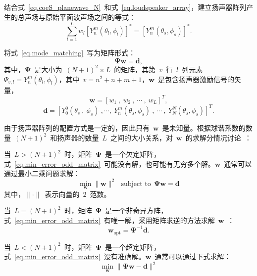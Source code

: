 结合式~\eqref{eq.coeS_planewave_N}~和式~\eqref{eq.loudspeaker_array}，建立扬声器阵列产生的总声场与原始平面波声场之间的等式：
\begin{equation}\label{eq.mode_matching}
   \sum_{l=1}^{L} w_{l} \left[ Y_n ^m(\theta_{l},\phi_{l}) \right] ^{*}  = \left[ Y_n ^m(\theta_{s},\phi_{s})\right] ^{*}.
\end{equation}

将式~\eqref{eq.mode_matching}~写为矩阵形式：
\begin{equation}\label{eq.min_error_odd_matrix}
\bm{\Psi w}=\bm{d},
\end{equation}
其中，$\mathbf{\Psi}$~是大小为~$(N+1)^2\times L$~的矩阵，其第~$v$~行~$l$~列元素~$\Psi_{v,l} = Y_{n}^{m}(\theta_{l},\phi_{l})$，其中~$v=n^2+n+m+1$，$\bm{w}$~是包含扬声器激励信号的矢量，
\begin{equation}\label{eq.matrix_a}
\bm{w} = [w_{1}~,~w_{2}~,~\cdots~,~w_{L}]^{T},
\end{equation}
\begin{equation}\label{eq.matrix_d}
\mathbf{d} = [Y_{0}^{0}(\theta_{s}~,~\phi_{s})~,\cdots,~Y_{n}^{m}(\theta_{s},\phi_{s})~,~\cdots~,~Y_{N}^{N}(\theta_{s},\phi_{s})]^{T}.
\end{equation}

由于扬声器阵列的配置方式是一定的，因此只有~$\bm{w}$~是未知量。根据球谐系数的数量~$(N+1)^2$~和扬声器的数量~$L$~之间的大小关系，对~$\bm{w}$~的求解分情况讨论~：
\begin{compactitem}
\item 当~$L>(N+1)^2$~时，矩阵~$\bm{\Psi}$~是一个欠定矩阵，式~\eqref{eq.min_error_odd_matrix}~可能没有解，也可能有无穷多个解。$\bm{w}$~通常可以通过最小二乘问题求解：
    \begin{equation}
    \mathop{\min}_{\bm{w}} \| \bm{w} \|^{2}~~~\text{subject to}~~\bm{\Psi w = d}
    \end{equation}
    其中，$\| \cdot \|$~表示向量的~2~范数。
\item 当~$L=(N+1)^2$~时，矩阵~$\mathbf{\Psi}$~是一个非奇异方阵，式~\eqref{eq.min_error_odd_matrix}~有唯一解，采用矩阵求逆的方法求解~$\bm{w}$~：
    \begin{equation}
    \bm{w}_{\text{opt}} = \bm{\Psi}^{-1}\bm{d}.
    \end{equation}
\item 当~$L<(N+1)^2$~时，矩阵~$\bm{\Psi}$~是一个超定矩阵，式~\eqref{eq.min_error_odd_matrix}~没有准确解。$\bm{w}$~通常可以通过下式求解：
    \begin{equation}
    \mathop{\min}_{\bm{w}} \| \bm{\Psi w- d} \|^{2}
    \end{equation}

\end{compactitem}


